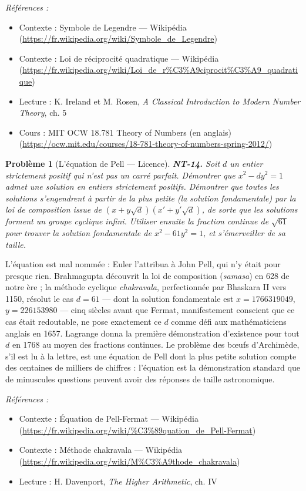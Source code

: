 \documentclass[11pt]{article}
\newtheorem{problem}{Problème}
\newenvironment{refs}{\par\small\noindent\emph{Références :}\begin{itemize}\setlength\itemsep{0pt}}{\end{itemize}\normalsize}
\begin{document}
\begin{refs}
\item Contexte : Symbole de Legendre --- Wikipédia (\url{https://fr.wikipedia.org/wiki/Symbole_de_Legendre})
\item Contexte : Loi de réciprocité quadratique --- Wikipédia (\url{https://fr.wikipedia.org/wiki/Loi_de_r%C3%A9ciprocit%C3%A9_quadratique})
\item Lecture : K. Ireland et M. Rosen, \textit{A Classical Introduction to Modern Number Theory}, ch. 5
\item Cours : MIT OCW 18.781 Theory of Numbers (en anglais) (\url{https://ocw.mit.edu/courses/18-781-theory-of-numbers-spring-2012/})
\end{refs}

\bigskip

\begin{problem}[{L'équation de Pell --- Licence}]
\textbf{NT-14.} Soit $d$ un entier strictement positif qui n'est pas un
carré parfait. Démontrer que $x^2 - dy^2 = 1$ admet une solution en entiers strictement positifs.
Démontrer que toutes les solutions s'engendrent à partir de la plus petite (la solution
fondamentale) par la loi de composition issue de $(x + y\sqrt{d})(x' + y'\sqrt{d})$, de sorte que
les solutions forment un groupe cyclique infini. Utiliser ensuite la fraction continue de
$\sqrt{61}$ pour trouver la solution fondamentale de $x^2 - 61y^2 = 1$, et s'émerveiller de sa
taille.
\end{problem}

\noindent L'équation est mal nommée : Euler l'attribua à John Pell, qui n'y était pour
presque rien. Brahmagupta découvrit la loi de composition (\textit{samasa}) en 628 de notre ère ; la
méthode cyclique \textit{chakravala}, perfectionnée par Bhaskara II vers 1150, résolut le cas
$d = 61$ --- dont la solution fondamentale est $x = 1766319049$, $y = 226153980$ --- cinq siècles
avant que Fermat, manifestement conscient que ce cas était redoutable, ne pose exactement ce $d$
comme défi aux mathématiciens anglais en 1657. Lagrange donna la première démonstration d'existence
pour tout $d$ en 1768 au moyen des fractions continues. Le problème des b\oe{}ufs d'Archimède, s'il est
lu à la lettre, est une équation de Pell dont la plus petite solution compte des centaines de
milliers de chiffres : l'équation est la démonstration standard que de minuscules questions peuvent
avoir des réponses de taille astronomique.

\begin{refs}
\item Contexte : Équation de Pell-Fermat --- Wikipédia (\url{https://fr.wikipedia.org/wiki/%C3%89quation_de_Pell-Fermat})
\item Contexte : Méthode chakravala --- Wikipédia (\url{https://fr.wikipedia.org/wiki/M%C3%A9thode_chakravala})
\item Lecture : H. Davenport, \textit{The Higher Arithmetic}, ch. IV
\end{refs}
\end{document}
